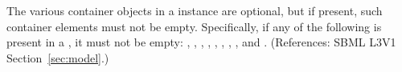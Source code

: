 \removedRule
  {The various  container objects in a \Model instance are
optional, but if present, such container elements must not be empty.
Specifically, if any of the following is present in a \Model, it must not
be empty: \ListOfFunctionDefinitions, \ListOfUnitDefinitions,
\mbox{\ListOfCompartments}, \ListOfSpecies, \ListOfParameters,
\ListOfInitialAssignments, \ListOfRules, \ListOfConstraints,
\mbox{\ListOfReactions} and \ListOfEvents.}
  {(References: SBML L3V1 Section~\ref{sec:model}.)}
